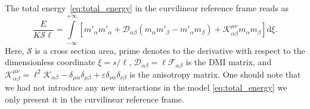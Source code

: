 The total energy~\eqref{eq:total_energy} in the curvilinear reference frame reads as
\begin{equation}\label{eq:totalEnergy_FrenetSerret}
\frac{E}{K\mathcal{S}\ell}=\int\limits_{-\infty}^{+\infty}\left[m'_\alpha m'_\alpha+\mathcal{D}_{\alpha\beta}\left(m_\alpha m'_\beta - m'_\alpha m_\beta\right)+\mathcal{K}^{\mu\nu}_{\alpha\beta}m_\alpha m_\beta\right]\mathrm{d}\xi.
\end{equation}
Here, $\mathcal{S}$ is a cross section area, prime denotes to the derivative with respect to the dimensionless coordinate $\xi=s/\ell$, $\mathcal{D}_{\alpha\beta}=\ell\mathcal{F}_{\alpha\beta}$ is the DMI matrix, and $\mathcal{K}^{\mu\nu}_{\alpha\beta}=\ell^2\mathcal{K}_{\alpha\beta}-\delta_{\mu\alpha}\delta_{\mu\beta}+\varepsilon\delta_{\nu\alpha}\delta_{\nu\beta}$ is the anisotropy matrix. One should note that we had not introduce any new interactions in the model \eqref{eq:total_energy} we only present it in the curvilinear reference frame.

